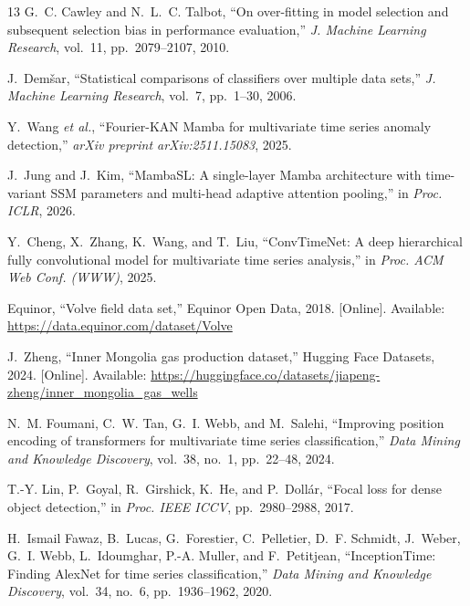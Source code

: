 \documentclass[conference]{IEEEtran}
\begin{document}
\begin{thebibliography}{13}
G.~C. Cawley and N.~L.~C. Talbot,
``On over-fitting in model selection and subsequent selection bias in performance evaluation,''
\textit{J. Machine Learning Research}, vol.~11, pp.~2079--2107, 2010.

J.~Dem{\v{s}}ar,
``Statistical comparisons of classifiers over multiple data sets,''
\textit{J. Machine Learning Research}, vol.~7, pp.~1--30, 2006.

Y.~Wang \textit{et al.},
``Fourier-KAN Mamba for multivariate time series anomaly detection,''
\textit{arXiv preprint arXiv:2511.15083}, 2025.

J.~Jung and J.~Kim,
``MambaSL: A single-layer Mamba architecture with time-variant SSM parameters and multi-head adaptive attention pooling,''
in \textit{Proc. ICLR}, 2026.

Y.~Cheng, X.~Zhang, K.~Wang, and T.~Liu,
``ConvTimeNet: A deep hierarchical fully convolutional model for multivariate time series analysis,''
in \textit{Proc. ACM Web Conf. (WWW)}, 2025.

Equinor,
``Volve field data set,''
Equinor Open Data, 2018.
[Online]. Available: \url{https://data.equinor.com/dataset/Volve}

J.~Zheng,
``Inner Mongolia gas production dataset,''
Hugging Face Datasets, 2024.
[Online]. Available: \url{https://huggingface.co/datasets/jiapeng-zheng/inner_mongolia_gas_wells}

N.~M. Foumani, C.~W. Tan, G.~I. Webb, and M.~Salehi,
``Improving position encoding of transformers for multivariate time series classification,''
\textit{Data Mining and Knowledge Discovery}, vol.~38, no.~1, pp.~22--48, 2024.

T.-Y. Lin, P.~Goyal, R.~Girshick, K.~He, and P.~Doll{\'a}r,
``Focal loss for dense object detection,''
in \textit{Proc. IEEE ICCV}, pp.~2980--2988, 2017.

H.~Ismail Fawaz, B.~Lucas, G.~Forestier, C.~Pelletier, D.~F. Schmidt, J.~Weber, G.~I. Webb, L.~Idoumghar, P.-A. Muller, and F.~Petitjean,
``InceptionTime: Finding AlexNet for time series classification,''
\textit{Data Mining and Knowledge Discovery}, vol.~34, no.~6, pp.~1936--1962, 2020.

\end{thebibliography}
\end{document}
